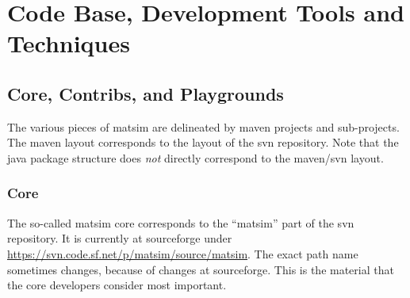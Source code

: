 \section{Code Base, Development Tools and Techniques}
\subsection{Core, Contribs, and Playgrounds}
\label{sec:core-contribs-playgrounds}
The various pieces of \gls{matsim} are delineated by \gls{maven} projects and sub-projects. 
The \gls{maven} layout corresponds to the layout of the \gls{svn} repository.  
Note that the \gls{java} package structure does \emph{not} directly correspond to the \gls{maven}/\gls{svn} layout.

\subsubsection{Core}
\label{sec:extending-core}
The so-called \gls{matsim} core corresponds to the ``matsim'' part of the \gls{svn} repository. 
It is currently at \gls{sourceforge} under \url{https://svn.code.sf.net/p/matsim/source/matsim}. 
The exact path name sometimes changes, \eg because of changes at \gls{sourceforge}.
This is the material that the core developers consider most important.

